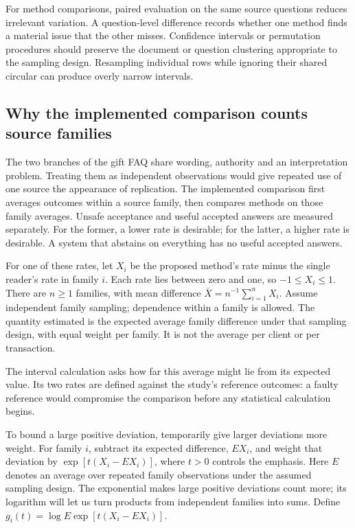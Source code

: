 \documentclass[12pt,a4paper,oneside,openany]{book}
\begin{document}
For method comparisons, paired evaluation on the same source questions reduces
irrelevant variation. A question-level difference records whether one method
finds a material issue that the other misses. Confidence intervals or permutation
procedures should preserve the document or question clustering appropriate to the
sampling design. Resampling individual rows while ignoring their shared circular
can produce overly narrow intervals.

\subsection{Why the implemented comparison counts source families}
\label{sec:family-comparison}

The two branches of the gift FAQ share wording, authority and an interpretation
problem. Treating them as independent observations would give repeated use of
one source the appearance of replication. The implemented comparison first
averages outcomes within a source family, then compares methods on those family
averages. Unsafe acceptance and useful accepted answers are measured separately.
For the former, a lower rate is desirable; for the latter, a higher rate is
desirable. A system that abstains on everything has no useful accepted answers.

For one of these rates, let $X_i$ be the proposed method's rate minus the single
reader's rate in family $i$. Each rate lies between zero and one, so
$-1\leq X_i\leq1$. There are $n\geq1$ families, with mean difference
$\bar X=n^{-1}\sum_{i=1}^{n}X_i$. Assume independent family sampling; dependence
within a family is allowed. The quantity estimated is the expected average
family difference under that sampling design, with equal weight per family.
It is not the average per client or per transaction.

The interval calculation asks how far this average might lie from its expected
value. Its two rates are defined against the study's reference outcomes: a
faulty reference would compromise the comparison before any statistical
calculation begins.

To bound a large positive deviation, temporarily give larger deviations more
weight. For family $i$, subtract its expected difference, $E X_i$, and weight
that deviation by $\exp[t(X_i-E X_i)]$, where $t>0$ controls the emphasis.
Here $E$ denotes an average over repeated family observations under the assumed
sampling design. The exponential makes large positive deviations count more;
its logarithm will let us turn products from independent families into sums.
Define $g_i(t)=\log E\exp[t(X_i-E X_i)]$.
\end{document}
